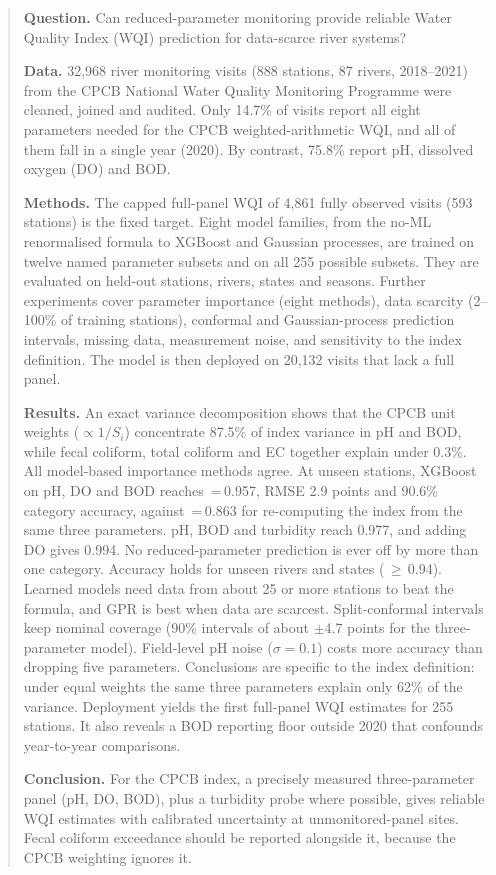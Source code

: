 \begin{abstract}
\noindent
\textbf{Question.} Can reduced-parameter monitoring provide reliable Water Quality Index (WQI) prediction for data-scarce river systems?

\textbf{Data.} 32,968 river monitoring visits (888 stations, 87 rivers, 2018--2021) from the CPCB National Water Quality Monitoring Programme were cleaned, joined and audited. Only 14.7\% of visits report all eight parameters needed for the CPCB weighted-arithmetic WQI, and all of them fall in a single year (2020). By contrast, 75.8\% report pH, dissolved oxygen (DO) and BOD.

\textbf{Methods.} The capped full-panel WQI of 4,861 fully observed visits (593 stations) is the fixed target. Eight model families, from the no-ML renormalised formula to XGBoost and Gaussian processes, are trained on twelve named parameter subsets and on all 255 possible subsets. They are evaluated on held-out stations, rivers, states and seasons. Further experiments cover parameter importance (eight methods), data scarcity (2--100\% of training stations), conformal and Gaussian-process prediction intervals, missing data, measurement noise, and sensitivity to the index definition. The model is then deployed on 20,132 visits that lack a full panel.

\textbf{Results.} An exact variance decomposition shows that the CPCB unit weights ($\propto 1/S_i$) concentrate 87.5\% of index variance in pH and BOD, while fecal coliform, total coliform and EC together explain under 0.3\%. All model-based importance methods agree. At unseen stations, XGBoost on pH, DO and BOD reaches \R{}\,=\,0.957, RMSE 2.9 points and 90.6\% category accuracy, against \R{}\,=\,0.863 for re-computing the index from the same three parameters. pH, BOD and turbidity reach 0.977, and adding DO gives 0.994. No reduced-parameter prediction is ever off by more than one category. Accuracy holds for unseen rivers and states (\R{}\,$\ge$\,0.94). Learned models need data from about 25 or more stations to beat the formula, and GPR is best when data are scarcest. Split-conformal intervals keep nominal coverage (90\% intervals of about $\pm$4.7 points for the three-parameter model). Field-level pH noise ($\sigma=0.1$) costs more accuracy than dropping five parameters. Conclusions are specific to the index definition: under equal weights the same three parameters explain only 62\% of the variance. Deployment yields the first full-panel WQI estimates for 255 stations. It also reveals a BOD reporting floor outside 2020 that confounds year-to-year comparisons.

\textbf{Conclusion.} For the CPCB index, a precisely measured three-parameter panel (pH, DO, BOD), plus a turbidity probe where possible, gives reliable WQI estimates with calibrated uncertainty at unmonitored-panel sites. Fecal coliform exceedance should be reported alongside it, because the CPCB weighting ignores it.
\end{abstract}
